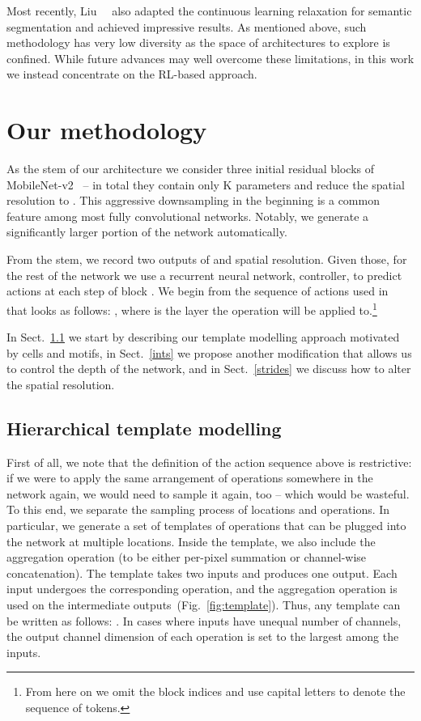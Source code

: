 \documentclass[10pt,twocolumn,letterpaper]{article}
\begin{document}
Most recently, Liu~\etal~\cite{abs-1901-02985} also adapted the continuous learning relaxation for semantic segmentation and achieved impressive results. As mentioned above, such methodology has very low diversity as the space of architectures to explore is confined. While future advances may well overcome these limitations, in this work we instead concentrate on the RL-based approach.
\section{Our methodology}

As the stem of our architecture we consider three initial residual blocks of MobileNet-v2~\cite{abs-1801-04381} -- in total they contain only K parameters and reduce the spatial resolution to . This aggressive downsampling in the beginning is a common feature among most fully convolutional networks. Notably, we generate a significantly larger portion of the network automatically.

From the stem, we record two outputs of  and  spatial resolution. Given those, for the rest of the network we use a recurrent neural network, controller, to predict actions  at each step  of block . We begin from the sequence of actions used in~\cite{abs-1810-10804} that looks as follows: , where  is the layer the operation  will be applied to.\footnote{From here on we omit the block indices and use capital letters to denote the sequence of tokens.}

In Sect.~\ref{htm} we start by describing our template modelling approach motivated by cells and motifs, in Sect.~\ref{ints} we propose another modification that allows us to control the depth of the network, and in Sect.~\ref{strides} we discuss how to alter the spatial resolution.

\subsection{Hierarchical template modelling}
\label{htm}

First of all, we note that the definition of the action sequence above is restrictive: if we were to apply the same arrangement of operations somewhere in the network again, we would need to sample it again, too -- which would be wasteful. To this end, we separate the sampling process of locations and operations. In particular, we generate a set of templates of operations that can be plugged into the network at multiple locations. Inside the template, we also include the aggregation operation  (to be either per-pixel summation or channel-wise concatenation). The template takes two inputs and produces one output. Each input undergoes the corresponding operation, and the aggregation operation is used on the intermediate outputs~(Fig.~\ref{fig:template}). Thus, any template can be written as follows: . In cases where inputs have unequal number of channels, the output channel dimension of each operation is set to the largest among the inputs.
\end{document}
